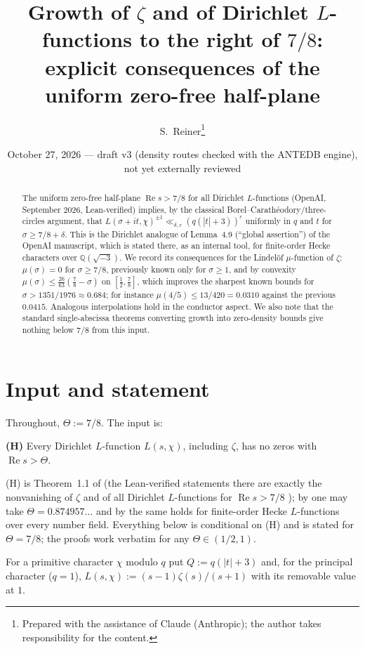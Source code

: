 \documentclass[11pt]{article}
\title{Growth of $\zeta$ and of Dirichlet $L$-functions to the right of $7/8$: \\ explicit consequences of the uniform zero-free half-plane}
\author{S.~Reiner\thanks{Prepared with the assistance of Claude (Anthropic); the author takes responsibility for the content.}}
\date{October 27, 2026 --- draft v3 (density routes checked with the ANTEDB engine), not yet externally reviewed}
\renewcommand{\Re}{\operatorname{Re}}
\begin{document}
\maketitle

\begin{abstract}
The uniform zero-free half-plane $\Re s>7/8$ for all Dirichlet $L$-functions (OpenAI, September 2026, Lean-verified) implies, by the classical Borel--Carath\'eodory/three-circles argument, that $L(\sigma+it,\chi)^{\pm1}\ll_{\delta,\varepsilon}(q(|t|+3))^{\varepsilon}$ uniformly in $q$ and $t$ for $\sigma\ge7/8+\delta$. This is the Dirichlet analogue of Lemma~4.9 (``global assertion'') of the OpenAI manuscript, which is stated there, as an internal tool, for finite-order Hecke characters over $\mathbb Q(\sqrt{-3})$. We record its consequences for the Lindel\"of $\mu$-function of $\zeta$: $\mu(\sigma)=0$ for $\sigma\ge7/8$, previously known only for $\sigma\ge1$, and by convexity $\mu(\sigma)\le\tfrac{26}{63}(\tfrac78-\sigma)$ on $[\tfrac12,\tfrac78]$, which improves the sharpest known bounds for $\sigma>1351/1976\approx0.684$; for instance $\mu(4/5)\le13/420=0.0310$ against the previous $0.0415$. Analogous interpolations hold in the conductor aspect. We also note that the standard single-abscissa theorems converting growth into zero-density bounds give nothing below $7/8$ from this input.
\end{abstract}

\section{Input and statement}

Throughout, $\Theta:=7/8$. The input is:

\medskip\noindent\textbf{(H)} Every Dirichlet $L$-function $L(s,\chi)$, including $\zeta$, has no zeros with $\Re s>\Theta$.

\medskip\noindent (H) is Theorem~1.1 of \cite{Ope26} (the Lean-verified statements there are exactly the nonvanishing of $\zeta$ and of all Dirichlet $L$-functions for $\Re s>7/8$ \cite{Ope26lean}); by \cite{Liu26} one may take $\Theta=0.874957\ldots$ and by \cite{Liu26b} the same holds for finite-order Hecke $L$-functions over every number field. Everything below is conditional on (H) and is stated for $\Theta=7/8$; the proofs work verbatim for any $\Theta\in(1/2,1)$.

For a primitive character $\chi$ modulo $q$ put $Q:=q(|t|+3)$ and, for the principal character ($q=1$), $L(s,\chi):=(s-1)\zeta(s)/(s+1)$ with its removable value at $1$.
\end{document}
